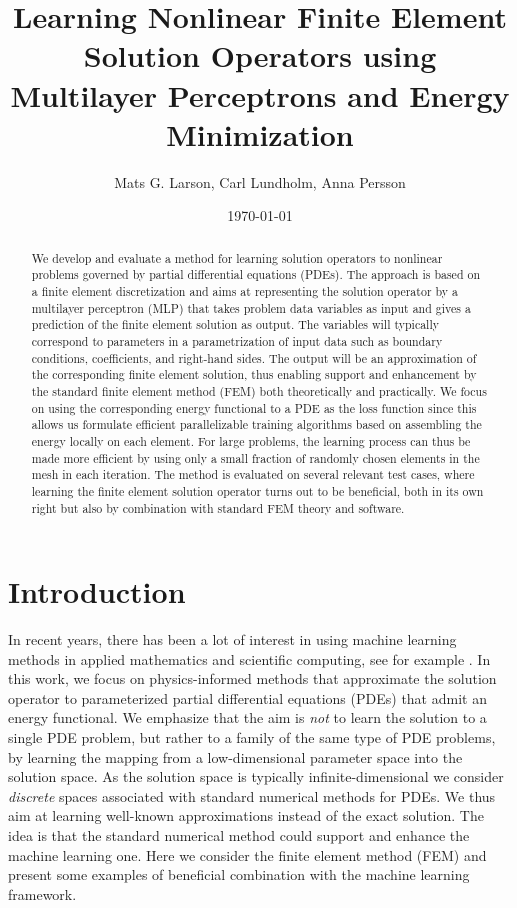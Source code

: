 \documentclass[12pt]{article}
\title{Learning Nonlinear Finite Element Solution Operators using Multilayer Perceptrons and Energy Minimization}
\date{\today}
\author{
Mats G. Larson,
Carl Lundholm,
Anna Persson
}
\date{}
\begin{document}
\maketitle

\begin{abstract}
We develop and evaluate a method for learning solution operators to nonlinear problems governed by partial differential equations (PDEs). The approach is based on a finite element discretization and aims at representing the solution operator by a multilayer perceptron (MLP) that takes problem data variables as input and gives a prediction of the finite element solution as output. The variables will
typically correspond to parameters in a parametrization of input data such as boundary conditions, coefficients, and right-hand sides. The output will be an approximation of the corresponding finite element solution, thus enabling support and enhancement by the standard finite element method (FEM) both theoretically and practically.
We focus on using the corresponding energy functional to a PDE as the loss function since this allows us formulate
efficient parallelizable training algorithms based on assembling the energy locally on each element. For large problems, the learning process can thus be made more efficient by using only a small fraction of randomly chosen elements in the mesh in each iteration.
The method is evaluated on several relevant test cases, where learning the finite element solution operator turns out to be beneficial, both in its own right but also by combination with standard FEM theory and software.
\end{abstract}

\section{Introduction}
In recent years, there has been a lot of interest in using machine learning methods in applied mathematics and scientific computing, see for example \cite{bookDLnCP}. In this work, we focus on physics-informed methods that approximate the solution operator to parameterized partial differential equations (PDEs) that admit an energy functional. We emphasize that the aim is \textit{not} to learn the solution to a single PDE problem, but rather to a family of the same type of PDE problems, by learning the mapping from a low-dimensional parameter space into the solution space. As the solution space is typically infinite-dimensional we consider \emph{discrete} spaces associated with standard numerical methods for PDEs. We thus aim at learning well-known approximations instead of the exact solution. The idea is that the standard numerical method could support and enhance the machine learning one. Here we consider the finite element method (FEM) and present some examples of beneficial combination with the machine learning framework.
\end{document}
